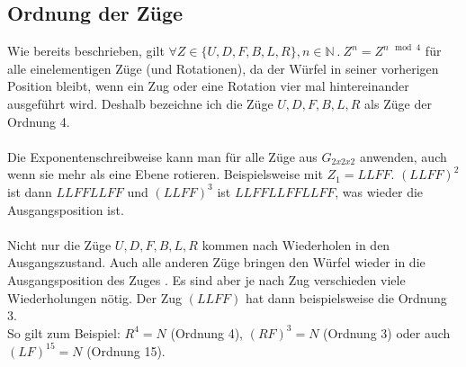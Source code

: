\documentclass[12pt,a4paper, usenames, dvipsnames]{article}
\begin{document}
\subsection*{Ordnung der Züge}
Wie bereits beschrieben, gilt $\forall Z \in \{ U, D, F, B, L, R \}, n \in \mathbb{N} \ . \ Z^n=Z^{n \mod 4}$ für alle einelementigen Züge (und Rotationen), da der Würfel in seiner vorherigen Position bleibt, wenn ein Zug oder eine Rotation vier mal hintereinander ausgeführt wird. Deshalb bezeichne ich die Züge $U, D, F, B, L, R$ als Züge der Ordnung 4. \\
\\
Die Exponentenschreibweise kann man für alle Züge aus $G_{2x2x2}$ anwenden, auch wenn sie mehr als eine Ebene rotieren. Beispielsweise mit $Z_1=LLFF$. $(LLFF)^2$ ist dann $LLFFLLFF$ und $(LLFF)^3$ ist $LLFFLLFFLLFF$, was wieder die Ausgangsposition ist. \\
\\
Nicht nur die Züge $U, D, F, B, L, R$ kommen nach Wiederholen in den Ausgangszustand. Auch alle anderen Züge bringen den Würfel wieder in die Ausgangsposition des Zuges \cite{TD}. Es sind aber je nach Zug verschieden viele Wiederholungen nötig. Der Zug $(LLFF)$ hat dann beispielsweise die Ordnung 3. \\
So gilt zum Beispiel: $R^4= N$ (Ordnung 4), $(RF)^3 = N$ (Ordnung 3) oder auch $(LF)^{15}=N$ (Ordnung 15).



\newpage








\end{document}
